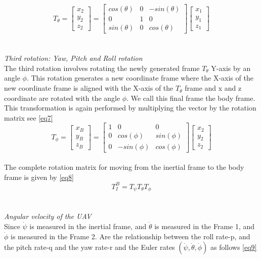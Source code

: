 \documentclass[conference]{IEEEtran}
\begin{document}
\begin{equation}
T_\theta=
\begin{bmatrix}
x_2\\
y_2\\
z_2 
\end{bmatrix}=
\begin{bmatrix}
cos(\theta) & 0 & -sin(\theta)\\
0 & 1 & 0 \\
sin(\theta) & 0 & cos(\theta)
\end{bmatrix}
\begin{bmatrix}
x_1\\
y_1\\
z_1 
\end{bmatrix}\label{eq6}
\end{equation}
\\\\
\textit{Third rotation: Yaw, Pitch and Roll rotation}\\
The third rotation involves rotating the newly generated frame $T_\theta$ Y-axis by an angle $\phi$.
This rotation generates a new coordinate frame where the X-axis of the new coordinate frame is aligned with the X-axis of the $T_\theta$ frame and x and z coordinate are rotated with the angle $\phi$. We call this final frame the body frame. This transformation is again performed by multiplying the vector by the rotation matrix see \cref{eq7}
\begin{equation}
T_\phi=
\begin{bmatrix}
x_B\\
y_B\\
z_B 
\end{bmatrix}=
\begin{bmatrix}
1 & 0 & 0\\
0 & cos(\phi) & sin(\phi) \\
0 & -sin(\phi) & cos(\phi)
\end{bmatrix}
\begin{bmatrix}
x_2\\
y_2\\
z_2 
\end{bmatrix}\label{eq7}
\end{equation}
\\
The complete rotation matrix for moving from the inertial frame to the body frame is given by \cref{eq8}
\begin{equation}
T^B_I = T_\psi T_\theta T_\phi\label{eq8}
\end{equation}
\\\\
\textit{Angular velocity of the UAV}\\
Since $\dot{\psi}$ is measured in the inertial frame, and $\dot{\theta}$ is measured in the Frame 1, and $\dot{\phi}$ is measured in the Frame 2. Are the relationship between the roll rate-p, and the pitch rate-q and the yaw rate-r and the Euler rates $(\dot{\psi},\dot{\theta},\dot{\phi})$ as follows \cref{eq9} 
\end{document}
